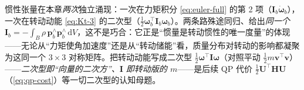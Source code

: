 \begin{insight}\label{ins:inertia-two-routes}
惯性张量在本章\emph{两次}独立涌现：一次在力矩积分 \cref{eq:euler-full} 的第 2 项（$\mathbf{I}_b\dot{\boldsymbol{\omega}}_b$），一次在转动动能 \cref{eq:Kt-3} 的二次型（$\tfrac12\boldsymbol{\omega}_b^\top\mathbf{I}_b\boldsymbol{\omega}_b$）。两条路殊途同归、给出\emph{同一个} $\mathbf{I}_b=-\int_B\rho\,\boldsymbol{p}_b^\wedge\boldsymbol{p}_b^\wedge\,\mathrm{d}V$，这不是巧合：它正是“惯量是转动惯性的唯一度量”的体现——无论从“力矩使角加速度”还是从“转动储能”看，质量分布对转动的影响都凝聚为这同一个 $3\times3$ 对称矩阵。把转动动能写成二次型 $\tfrac12\boldsymbol{\omega}^\top\mathbf{I}\boldsymbol{\omega}$（对照平动 $\tfrac12 m\boldsymbol{v}^\top\boldsymbol{v}$）——\emph{二次型即“向量的二次方”、$\mathbf{I}$ 即转动版的 $m$}——是后续 QP 代价 $\tfrac12\mathbf{U}^\top\mathbf{H}\mathbf{U}$（\cref{eq:qp-cost}）等一切二次型的认知母题。
\end{insight}

